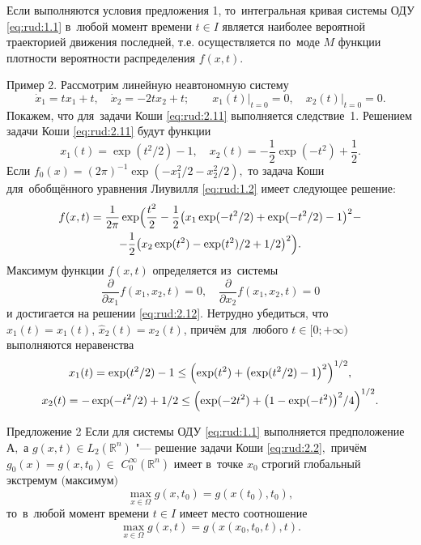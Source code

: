 Если выполняются условия предложения 1, то~интегральная кривая
системы ОДУ \eqref{eq:rud:1.1} в~любой момент времени $t\in I$
является наиболее вероятной траекторией движения последней, т.е.
осуществляется по~моде $M$ функции плотности вероятности
распределения $f(x,t)$.

\smallskip

{\small \sc Пример 2.} Рассмотрим линейную неавтономную систему
\begin{equation}
\dot x_1=tx_1+t,\quad \dot x_2=-2tx_2+t;\qquad x_1(t)\big|_{t=0}=0,\quad x_2(t)\big|_{t=0}=0.\label{eq:rud:2.11}
\end{equation}
Покажем, что для~задачи Коши \eqref{eq:rud:2.11} выполняется следствие~1. Решением задачи Коши \eqref{eq:rud:2.11} будут
функции
\begin{equation}
x_1(t)=\exp({t^2}/2)-1,\quad  x_2(t)=-\frac{1}{2}\exp({-t^2})+\frac{1}{2}.\label{eq:rud:2.12}
\end{equation}
Если
$f_0(x)=({2\pi})^{-1}\exp{(-x_1^2/2-x_2^2/2)},$ то задача Коши для~обобщённого уравнения Лиувилля \eqref{eq:rud:1.2} имеет следующее решение:
\begin{multline*}
f(x,t)=\frac{1}{2\pi}\exp\Bigl(\frac{t^2}{2}-\frac{1}{2}\bigl(x_1\exp(-t^2/2)+\exp(-t^2/2)-1\bigr)^2 -\\ 
-\frac{1}{2}\bigl(x_2\exp(t^2)-\exp(t^2)/2+{1}/{2}\bigr)^2\Bigr).
\end{multline*}
Максимум функции $f(x,t)$ определяется из~системы
$$\frac{\partial}{\partial x_1}f(x_1,x_2,t)=0,\quad \frac{\partial}{\partial x_2}f(x_1,x_2,t)=0 $$ и достигается на
решении \eqref{eq:rud:2.12}. Нетрудно убедиться, что $\hat x_1(t)=x_1(t)$, $\hat x_2(t)=x_2(t)$, причём для~любого $t\in
[0;+\infty)$ выполняются неравенства
\begin{gather*}
x_1(t)=\exp(t^2/2)-1\le \Bigl(\exp({t^2})+\bigl(\exp({{t^2}/2})-1\bigr)^2\Bigr)^{1/2},
\\
x_2(t)=-\exp(-t^2/2)+{1}/{2}\le \Bigl(\exp(-2t^2)+ \bigl(1-\exp(-t^2)\bigr)^2/4\Bigr)^{1/2}.
\end{gather*}

\smallskip

\begin{newthm}{Предложение 2}
Если для системы ОДУ \eqref{eq:rud:1.1} выполняется предположение А$,$ а $g(x,t)\in L_2(\mathbb R^n)$ "--- решение задачи Коши
\eqref{eq:rud:2.2}$,$ причём $g_0(x){=}g(x,t_0){\in}$ $C_0^{\infty}(\mathbb R^n)$ имеет в~точке $x_0$ строгий глобальный
экстремум $($максимум\/$)$
$$\max\limits_{x\in\Omega}g(x,t_0)=g(x(t_0),t_0),$$ то~в~любой
момент времени $t\in I$ имеет место соотношение
$$
\max\limits_{x\in\Omega}g(x,t)=g(x(x_0,t_0,t),t).
$$
\end{newthm}

